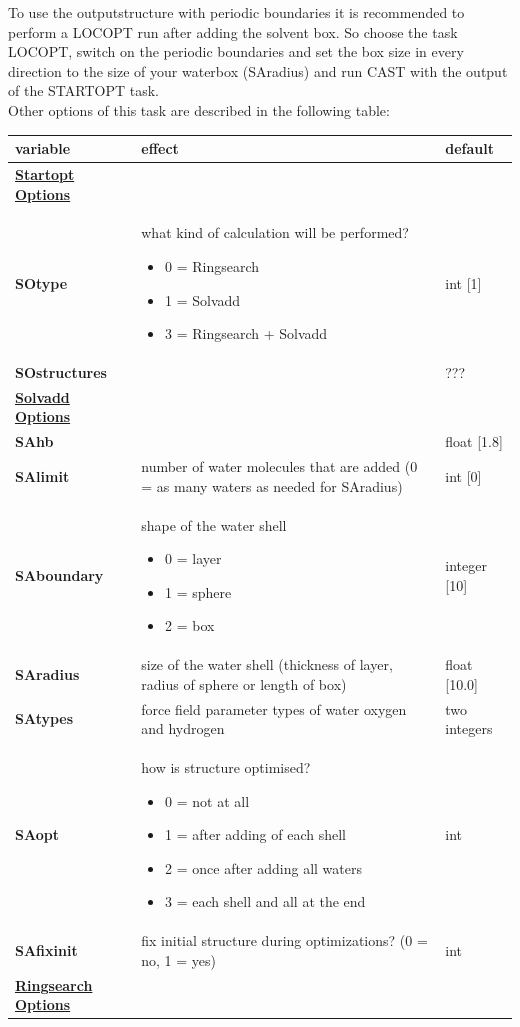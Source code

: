 \documentclass[10pt,a4paper]{article} %
\begin{document}
	To use the outputstructure with periodic boundaries it is recommended to perform a LOCOPT run after adding the solvent box. So choose the task LOCOPT, switch on the periodic boundaries and set the box size in every direction to the size of your waterbox (SAradius) and run \ac{CAST} with the output of the START\-OPT task.\\
	
	Other options of this task are described in the following table:
	
	\begin{longtable}{|p{3.5cm}|p{5cm}|p{2.5cm}|}
		variable & effect & default \\
		\hline
    \textbf{\underline{Startopt Options}} &  &  \\ 
		\textbf{SOtype} & what kind of calculation will be performed? 
	\begin{itemize}
		\item 0 = Ringsearch
		\item 1 = Solvadd
		\item 3 = Ringsearch + Solvadd
	\end{itemize}	
	  & int [1]\\
		\textbf{SOstructures} & \todo[inline]{SOstructures} & ??? \\
		\hline
		\textbf{\underline{Solvadd Options}} & &  \\
		\textbf{SAhb} & \todo[inline]{SAhb} & float [1.8] \\
		\textbf{SAlimit} & number of water molecules that are added (0 = as many waters as needed for SAradius) & int [0] \\
		\textbf{SAboundary} & shape of the water shell \begin{itemize} \item 0 = layer\item 1 = sphere \item 2 = box \end{itemize} & integer [10] \\
		\textbf{SAradius} & size of the water shell (thickness of layer, radius of sphere or length of box) & float [10.0]\\
		\textbf{SAtypes} & force field parameter types of water oxygen and hydrogen & two integers \\
		\textbf{SAopt} & how is structure optimised? \begin{itemize} \item 0 = not at all \item 1 = after adding of each shell \item 2 = once after adding all waters \item 3 = each shell and all at the end \end{itemize} & int \\
		\textbf{SAfixinit} & fix initial structure during optimizations? (0 = no, 1 = yes) & int \\
		\hline
		\textbf{\underline{Ringsearch Options}} & \todo[inline]{Ringsearch options} &  \\ 
	\end{longtable}
\end{document}
